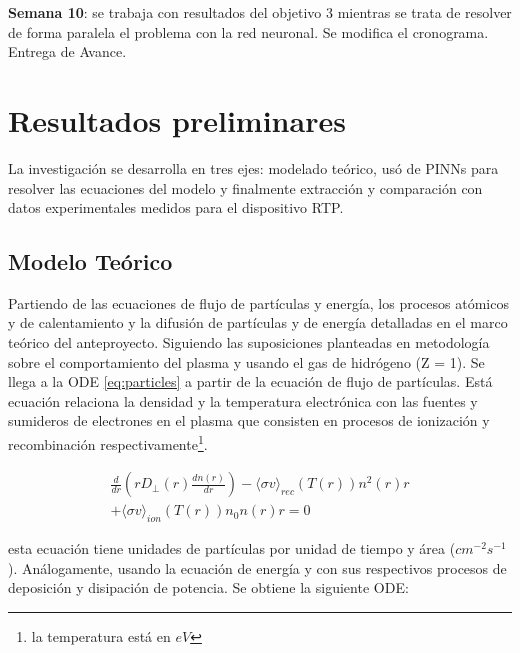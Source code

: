 \textbf{Semana 10}: se trabaja con resultados del objetivo 3 mientras se trata de resolver de forma paralela el problema con la red neuronal. Se modifica el cronograma. Entrega de Avance. \\


\section{Resultados preliminares}

La investigación se desarrolla en tres ejes: modelado teórico, usó de PINNs para resolver las ecuaciones del modelo y finalmente extracción y comparación con datos experimentales medidos para el dispositivo RTP. 

\subsection{Modelo Teórico}

Partiendo de las ecuaciones de flujo de partículas y energía, los procesos atómicos y de calentamiento y la difusión de partículas y de energía detalladas en el marco teórico del anteproyecto. Siguiendo las suposiciones planteadas en metodología sobre el comportamiento del plasma y usando el gas de hidrógeno (Z = 1).  Se llega a la ODE \eqref{eq:particles} a partir de la ecuación de flujo de partículas. Está ecuación relaciona la densidad y la temperatura electrónica con las fuentes y sumideros de electrones en el plasma que consisten en procesos de ionización y recombinación respectivamente\footnote{la temperatura está en $eV$}.

\begin{eqnarray}\label{eq:particles}
	\frac{d}{dr}\left(rD_\perp(r) \frac{dn(r)}{dr}\right) - \langle\sigma v\rangle_{rec}( T(r) )n^2(r)r \nonumber\\
	+ \langle\sigma v\rangle_{ion}(T(r)) n_0 n(r) r = 0
\end{eqnarray}

esta ecuación tiene unidades de partículas por unidad de tiempo y área ($cm^{-2}s^{-1}$). Análogamente, usando la ecuación de energía y con sus respectivos procesos de deposición y disipación de potencia. Se obtiene la siguiente ODE: 

